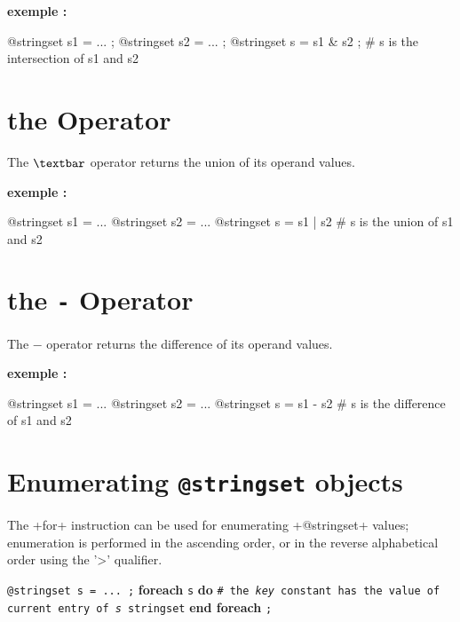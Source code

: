 \textbf{exemple :}
\begin{galgas}
@stringset s1 = ... ;
@stringset s2 = ... ;
@stringset s = s1 & s2 ; # s is the intersection of s1 and s2
\end{galgas}






\section{the \texttt{\textbar} Operator}

The \emph{$\textbar$} operator returns the union of its operand values.

\textbf{exemple :}
\begin{galgas}
@stringset s1 = ...
@stringset s2 = ...
@stringset s = s1 | s2 # s is the union of s1 and s2
\end{galgas}






\section{the \texttt{-} Operator}

The \emph{$-$} operator returns the difference of its operand values.

\textbf{exemple :}
\begin{galgas}
@stringset s1 = ...
@stringset s2 = ...
@stringset s = s1 - s2 # s is the difference of s1 and s2
\end{galgas}








\section{Enumerating \texttt{@stringset} objects}


The \ggs+for+ instruction can be used for enumerating \ggs+@stringset+ values; enumeration is performed in the ascending order, or in the reverse alphabetical order using the '>' qualifier.

\texttt{@stringset s = ... ;}\newline
\textbf{foreach} \texttt {s} \textbf {do}\newline
\texttt{\# the \emph{key} constant has the value of current entry of \emph{s} stringset}\newline
\textbf{end foreach} \texttt{;}







